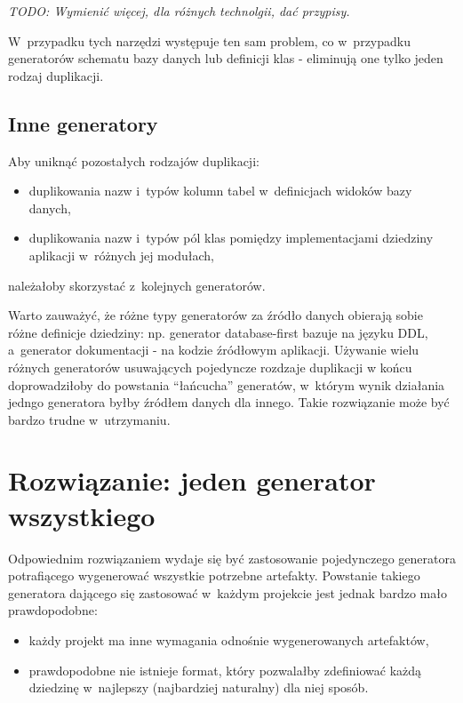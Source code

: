 \emph{TODO: Wymienić więcej, dla różnych technolgii, dać przypisy.}

W~przypadku tych narzędzi występuje ten sam problem, co w~przypadku generatorów schematu bazy danych lub definicji klas - eliminują one tylko jeden rodzaj duplikacji.


\subsection{Inne generatory}

Aby uniknąć pozostałych rodzajów duplikacji:

\begin{itemize}
 \item duplikowania nazw i~typów kolumn tabel w~definicjach widoków bazy danych,
 \item duplikowania nazw i~typów pól klas pomiędzy implementacjami dziedziny aplikacji w~różnych jej modułach,
\end{itemize}

należałoby skorzystać z~kolejnych generatorów.

Warto zauważyć, że różne typy generatorów za źródło danych obierają sobie różne definicje dziedziny: np. generator database-first bazuje na języku DDL, a~generator dokumentacji - na kodzie źródłowym aplikacji.
Używanie wielu różnych generatorów usuwających pojedyncze rozdzaje duplikacji w końcu doprowadziłoby do powstania ``łańcucha'' generatów, w~którym wynik działania jedngo generatora byłby źródłem danych dla innego.
Takie rozwiązanie może być bardzo trudne w~utrzymaniu.



\section{Rozwiązanie: jeden generator wszystkiego}

Odpowiednim rozwiązaniem wydaje się być zastosowanie pojedynczego generatora potrafiącego wygenerować wszystkie potrzebne artefakty.
Powstanie takiego generatora dającego się zastosować w~każdym projekcie jest jednak bardzo mało prawdopodobne:

\begin{itemize}
 \item każdy projekt ma inne wymagania odnośnie wygenerowanych artefaktów,
 \item prawdopodobne nie istnieje format, który pozwalałby zdefiniować każdą dziedzinę w~najlepszy (najbardziej naturalny) dla niej sposób.
\end{itemize}
